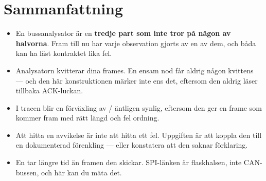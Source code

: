 \section*{Sammanfattning}

\begin{itemize}
  \item En bussanalysator är en \textbf{tredje part som inte tror på någon av halvorna}. Fram till
    nu har varje observation gjorts av en av dem, och båda kan ha läst kontraktet lika fel.
  \item Analysatorn kvitterar dina frames. En ensam nod får aldrig någon kvittens --- och den här
    konstruktionen märker inte ens det, eftersom den aldrig läser tillbaka ACK-luckan.
  \item I tracen blir en förväxling av / äntligen synlig, eftersom den
    ger en frame som kommer fram med rätt längd och fel ordning.
  \item Att hitta en avvikelse är inte att hitta ett fel. Uppgiften är att koppla den till en
    dokumenterad förenkling --- eller konstatera att den saknar förklaring.
  \item En  tar längre tid än framen den skickar. SPI-länken är flaskhalsen, inte
    CAN-bussen, och här kan du mäta det.
\end{itemize}
